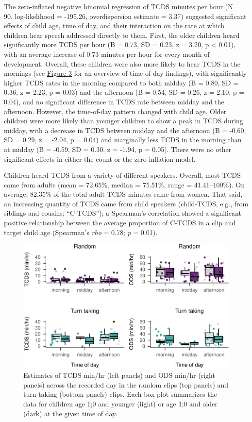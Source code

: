 \documentclass[,man,floatsintext]{apa6}
\begin{document}
The zero-inflated negative binomial regression of TCDS minutes per hour
(N = 90, log-likelihood = -195.26, overdispersion estimate = 3.37)
suggested significant effects of child age, time of day, and their
interaction on the rate at which children hear speech addressed directly
to them. First, the older children heard significantly more TCDS per
hour (B = 0.73, SD = 0.23, z = 3.20, p \textless{} 0.01), with an
average increase of 0.73 minutes per hour for every month of
development. Overall, these children were also more likely to hear TCDS
in the mornings (see \protect\hyperlink{fig3}{Figure 3} for an overview
of time-of-day findings), with significantly higher TCDS rates in the
morning compared to both midday (B = 0.80, SD = 0.36, z = 2.23, p =
0.03) and the afternoon (B = 0.54, SD = 0.26, z = 2.10, p = 0.04), and
no significant difference in TCDS rate between midday and the afternoon.
However, the time-of-day pattern changed with child age. Older children
were more likely than younger children to show a peak in TCDS during
midday, with a decrease in TCDS between midday and the afternoon (B =
-0.60, SD = 0.29, z = -2.04, p = 0.04) and marginally less TCDS in the
morning than at midday (B = -0.59, SD = 0.30, z = -1.94, p = 0.05).
There were no other significant effects in either the count or the
zero-inflation model.

Children heard TCDS from a variety of different speakers. Overall, most
TCDS came from adults (mean = 72.65\%, median = 75.51\%, range =
41.41--100\%). On average, 82.35\% of the total adult TCDS minutes came
from women. That said, an increasing quantity of TCDS came from child
speakers (child-TCDS, e.g., from siblings and cousins;
\enquote{C-TCDS}); a Spearman's correlation showed a significant
positive relationship between the average proportion of C-TCDS in a clip
and target child age (Spearman's \emph{rho} = 0.78; \emph{p} = 0.01).

\begin{figure}
\centering
\includegraphics{Yeli-CLE_files/figure-latex/fig3-1.pdf}
\caption{\label{fig:fig3}Estimates of TCDS min/hr (left panels) and ODS
min/hr (right panels) across the recorded day in the random clips (top
panels) and turn-taking (bottom panels) clips. Each box plot summarizes
the data for children age 1;0 and younger (light) or age 1;0 and older
(dark) at the given time of day.}
\end{figure}
\end{document}
